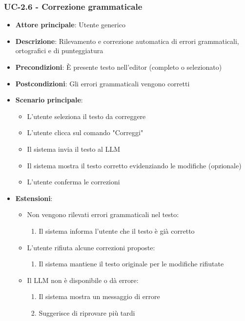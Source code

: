 \documentclass[11pt,a4paper]{article}
\begin{document}
\subsubsection{UC-2.6 - Correzione grammaticale}
\begin{itemize}
    \item \textbf{Attore principale}: Utente generico
    \item \textbf{Descrizione}: Rilevamento e correzione automatica di errori grammaticali, ortografici e di punteggiatura
    \item \textbf{Precondizioni}: È presente testo nell'editor (completo o selezionato)
    \item \textbf{Postcondizioni}: Gli errori grammaticali vengono corretti
    \item \textbf{Scenario principale}:
        \begin{itemize}
            \item L'utente seleziona il testo da correggere
            \item L'utente clicca sul comando "Correggi"
            \item Il sistema invia il testo al LLM
            \item Il sistema mostra il testo corretto evidenziando le modifiche (opzionale)
            \item L'utente conferma le correzioni
        \end{itemize}
    \item \textbf{Estensioni}:
        \begin{itemize}
            \item Non vengono rilevati errori grammaticali nel testo:
                \begin{enumerate}
                    \item Il sistema informa l'utente che il testo è già corretto
                \end{enumerate}
            \item L'utente rifiuta alcune correzioni proposte:
                \begin{enumerate}
                    \item Il sistema mantiene il testo originale per le modifiche rifiutate
                \end{enumerate}
            \item Il LLM non è disponibile o dà errore:
                \begin{enumerate}
                    \item Il sistema mostra un messaggio di errore
                    \item Suggerisce di riprovare più tardi
                \end{enumerate}
        \end{itemize}
\end{itemize}
\end{document}
